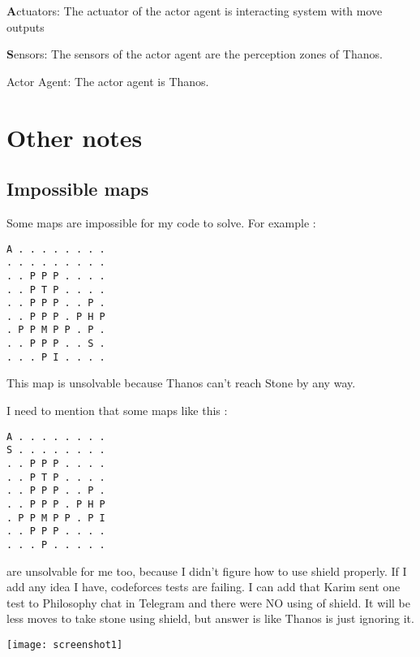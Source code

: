 \documentclass{article}
\begin{document}
\textbf{A}ctuators: The actuator of the actor agent is interacting system with move outputs

\textbf{S}ensors: The sensors of the actor agent are the perception zones of Thanos.

Actor Agent: The actor agent is Thanos.

\section*{Other notes}

\subsection*{Impossible maps}
Some maps are impossible for my code to solve.  For example :

\begin{verbatim}
A . . . . . . . .
. . . . . . . . .
. . P P P . . . .
. . P T P . . . .
. . P P P . . P .
. . P P P . P H P
. P P M P P . P .
. . P P P . . S .
. . . P I . . . .

\end{verbatim}

This map is unsolvable because Thanos can't reach Stone by any way. 

I need to mention that some maps like this :
\begin{verbatim}
A . . . . . . . .
S . . . . . . . .
. . P P P . . . .
. . P T P . . . .
. . P P P . . P .
. . P P P . P H P
. P P M P P . P I
. . P P P . . . .
. . . P . . . . .

\end{verbatim}

are unsolvable for me too, because I didn't figure how to use shield properly. If I add any idea I have, codeforces tests are failing. I can add that Karim sent one test to Philosophy chat in Telegram and there were NO using of shield. It will be less moves to take stone using shield, but answer is like Thanos is just ignoring it. 

\texttt{[image: screenshot1]}
\end{document}
